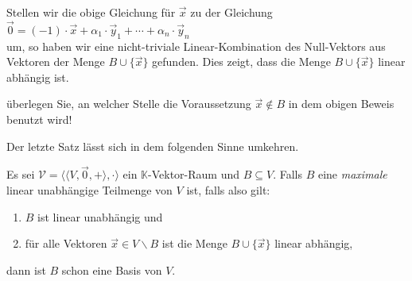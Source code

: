 Stellen wir die obige Gleichung f\"{u}r $\vec{x}$ zu der Gleichung
\\[0.2cm]
\hspace*{1.3cm}
$\vec{0} = (-1) \cdot \vec{x} + \alpha_1 \cdot \vec{y}_1 + \cdots + \alpha_n \cdot \vec{y}_n$
\\[0.2cm]
um, so haben wir eine nicht-triviale Linear-Kombination des Null-Vektors aus Vektoren der Menge 
$B \cup \{ \vec{x} \}$ gefunden.  Dies zeigt, dass die Menge $B \cup \{ \vec{x} \}$ linear abh\"{a}ngig
ist. \qeds

\exercise
\"{u}berlegen Sie, an welcher Stelle die Voraussetzung $\vec{x} \not\in B$ in dem obigen Beweis benutzt wird!
\eox

\noindent
Der letzte Satz l\"{a}sst sich in dem folgenden Sinne umkehren.

\begin{Satz}
  Es sei $\mathcal{V} = \bigl\langle \langle V, \vec{0}, + \rangle, \cdot \bigr\rangle$ ein $\mathbb{K}$-Vektor-Raum 
  und $B \subseteq V$.  Falls $B$ eine \emph{maximale} linear 
  unabh\"{a}ngige Teilmenge von $V$ ist, falls also gilt:
  \begin{enumerate}
  \item $B$ ist linear unabh\"{a}ngig und
  \item f\"{u}r alle Vektoren $\vec{x} \in V \backslash B$ ist die Menge $B \cup \{ \vec{x} \}$
        linear abh\"{a}ngig,
  \end{enumerate}
  dann ist $B$ schon eine Basis von $V$.
\end{Satz}

